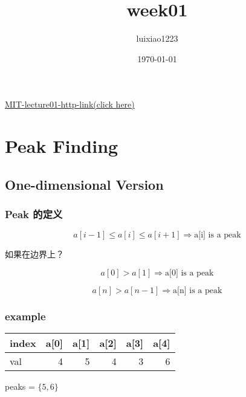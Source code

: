 \documentclass[11pt]{article}
\author{luixiao1223}
\date{\today}
\title{week01}
\begin{document}
\begin{CJK}{UTF8}{gbsn}
  
\maketitle

\href{https://ocw.mit.edu/courses/electrical-engineering-and-computer-science/6-006-introduction-to-algorithms-fall-2011/lecture-videos/MIT6\_006F11\_lec01.pdf}{MIT-lecture01-http-link(click here)}

\section{Peak Finding}

\subsection{One-dimensional Version}

\subsubsection{Peak 的定义}
\begin{equation}
a[i-1]\leqslant a[i] \leqslant a[i+1] \Rightarrow \text{a[i] is a peak}
\end{equation}

如果在边界上？

\begin{equation}
a[0]>a[1] \Rightarrow \mbox{a[0] is a peak}
\end{equation}

\begin{equation}
a[n]>a[n-1]\Rightarrow \mbox{a[n] is a peak}
\end{equation}

\subsubsection{example}

\begin{center}
  \begin{tabular}{|l|r|r|r|r|r|}
    \hline
    index & a[0] & a[1] & a[2] & a[3] & a[4]\\
    \hline
    val & 4 & 5 & 4 & 3 & 6\\
    \hline
  \end{tabular}
\end{center}

peaks = \(\{5,6\}\)


\end{CJK}
\end{document}

